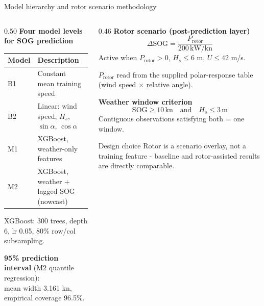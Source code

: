 \documentclass[aspectratio=169,10pt]{beamer}
\begin{document}
\begin{frame}[t]{Model hierarchy and rotor scenario methodology}
\begin{columns}[T,onlytextwidth]
\begin{column}{0.50\textwidth}
\footnotesize
\textbf{Four model levels for SOG prediction}
\begin{center}
\begin{tabular}{lp{4.4cm}}
\toprule
\textbf{Model} & \textbf{Description} \\
\midrule
B1 & Constant mean training speed \\
B2 & Linear: wind speed, $H_s$, $\sin\alpha$, $\cos\alpha$ \\
M1 & XGBoost, weather-only features \\
M2 & XGBoost, weather + lagged SOG (nowcast) \\
\bottomrule
\end{tabular}
\end{center}
XGBoost: 300 trees, depth 6, lr 0.05, 80\% row/col subsampling.

\vspace{0.2cm}
\textbf{95\% prediction interval} (M2 quantile regression):\\
mean width 3.161 kn, empirical coverage 96.5\%.
\end{column}
\begin{column}{0.46\textwidth}
\footnotesize
\textbf{Rotor scenario (post-prediction layer)}
\[
\Delta\text{SOG} = \frac{P_\text{rotor}}{200\,\text{kW/kn}}
\]
Active when $P_\text{rotor}>0$, $H_s \leq 6$ m, $U \leq 42$ m/s.

$P_\text{rotor}$ read from the supplied polar-response table (wind speed $\times$ relative angle).

\vspace{0.1cm}
\textbf{Weather window criterion}
\[
\text{SOG} \geq 10\,\text{kn} \quad\text{and}\quad H_s \leq 3\,\text{m}
\]
Contiguous observations satisfying both = one window.

\begin{block}{Design choice}
Rotor is a scenario overlay, not a training feature - baseline and rotor-assisted results are directly comparable.
\end{block}
\end{column}
\end{columns}
\end{frame}

\end{document}
